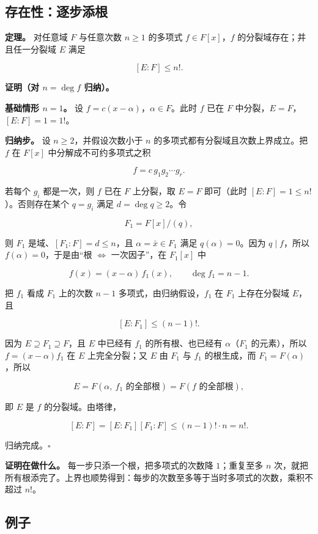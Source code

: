 \subsection{存在性：逐步添根}


\textbf{定理。} 对任意域 $F$ 与任意次数 $n\ge1$ 的多项式 $f\in F[x]$，$f$ 的分裂域存在；并且任一分裂域 $E$ 满足

\[
[E:F]\le n!.
\]

\textbf{证明（对 $n=\deg f$ 归纳）。}

\textbf{基础情形 $n=1$。} 设 $f=c(x-\alpha)$，$\alpha\in F$。此时 $f$ 已在 $F$ 中分裂，$E=F$，$[E:F]=1=1!$。

\textbf{归纳步。} 设 $n\ge2$，并假设次数小于 $n$ 的多项式都有分裂域且次数上界成立。把 $f$ 在 $F[x]$ 中分解成不可约多项式之积

\[
f=c\,g_1g_2\cdots g_r .
\]

若每个 $g_i$ 都是一次，则 $f$ 已在 $F$ 上分裂，取 $E=F$ 即可（此时 $[E:F]=1\le n!$）。否则存在某个 $q=g_i$ 满足 $d=\deg q\ge2$。令

\[
F_1=F[x]/(q),
\]

则 $F_1$ 是域、$[F_1:F]=d\le n$，且 $\alpha=\bar x\in F_1$ 满足 $q(\alpha)=0$。因为 $q\mid f$，所以 $f(\alpha)=0$，于是由“根 $\iff$ 一次因子”，在 $F_1[x]$ 中

\[
f(x)=(x-\alpha)\,f_1(x),\qquad \deg f_1=n-1.
\]

把 $f_1$ 看成 $F_1$ 上的次数 $n-1$ 多项式，由归纳假设，$f_1$ 在 $F_1$ 上存在分裂域 $E$，且

\[
[E:F_1]\le (n-1)!.
\]

因为 $E\supseteq F_1\supseteq F$，且 $E$ 中已经有 $f_1$ 的所有根、也已经有 $\alpha$（$F_1$ 的元素），所以 $f=(x-\alpha)f_1$ 在 $E$ 上完全分裂；又 $E$ 由 $F_1$ 与 $f_1$ 的根生成，而 $F_1=F(\alpha)$，所以

\[
E=F(\alpha,\ \text{$f_1$ 的全部根})=F(\text{$f$ 的全部根}),
\]

即 $E$ 是 $f$ 的分裂域。由塔律，

\[
[E:F]=[E:F_1][F_1:F]\le (n-1)!\cdot n=n!.
\]

归纳完成。$\square$

\textbf{证明在做什么。} 每一步只添一个根，把多项式的次数降 $1$；重复至多 $n$ 次，就把所有根添完了。上界也顺势得到：每步的次数至多等于当时多项式的次数，乘积不超过 $n!$。

\subsection{例子}


